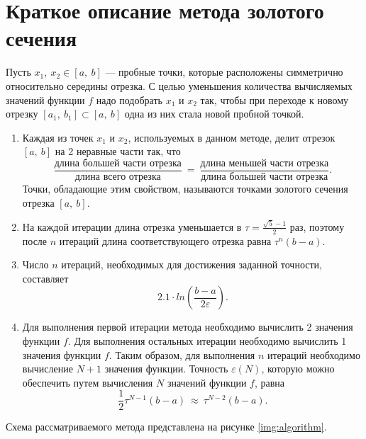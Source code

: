 \documentclass{bmstu}
\begin{document}
\clearpage

\section{Краткое описание метода золотого сечения}

Пусть $x_1, \ x_2 \in [a, \ b]$ --- пробные точки, которые расположены симметрично относительно середины отрезка. С целью уменьшения количества вычисляемых значений функции $f$ надо подобрать $x_1$ и $x_2$ так, чтобы при переходе к новому отрезку $[a_1, \ b_1] \subset [a, \ b]$ одна из них стала новой пробной точкой.

\begin{enumerate}
    \item Каждая из точек $x_1$ и $x_2$, используемых в данном методе, делит отрезок $[a, \ b]$ на 2 неравные части так, что 
    \begin{equation}
        \frac{\text{длина большей части отрезка}}{\text{длина всего отрезка}} \ = \ 
        \frac{\text{длина меньшей части отрезка}}{\text{длина большей части отрезка}}.
    \end{equation}
    Точки, обладающие этим свойством, называются точками золотого сечения отрезка $[a, \ b]$.
    \item На каждой итерации длина отрезка уменьшается в $\tau = \frac{\sqrt{5} - 1}{2}$ раз, поэтому после $n$ итераций длина соответствующего отрезка равна $\tau^n(b - a)$.
    \item Число $n$ итераций, необходимых для достижения заданной точности, составляет
    \begin{equation}
        2.1 \cdot ln(\frac{b - a}{2 \varepsilon}).
    \end{equation}
    \item Для выполнения первой итерации метода необходимо вычислить 2 значения функции $f$. Для выполнения остальных итерации необходимо вычислить 1 значения функции $f$. Таким образом, для выполнения $n$ итераций необходимо вычисление $N + 1$ значения функции. Точность $\varepsilon(N)$, которую можно обеспечить путем вычисления $N$ значений функции $f$, равна
    \begin{equation}
        \frac{1}{2} \tau^{N - 1} (b - a) \ \approx \ \tau^{N - 2} (b - a).
    \end{equation}
\end{enumerate}

\clearpage

Схема рассматриваемого метода представлена на рисунке \ref{img:algorithm}. 
\end{document}
